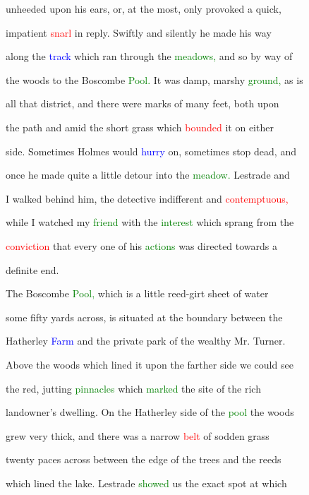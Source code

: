  unheeded upon his ears, or, at the most, only provoked a quick,

 \textcolor{BurntOrange}{impatient} \textcolor{red}{snarl} in reply. Swiftly and silently he made his way

 along the \textcolor{blue}{track} which ran through the \textcolor{green}{meadows,} and so by way of

 the woods to the Boscombe \textcolor{green}{Pool.} It was damp, marshy \textcolor{green}{ground,} as is

 all that district, and there were marks of many feet, both upon

 the path and amid the short grass which \textcolor{red}{bounded} it on either

 side. Sometimes Holmes would \textcolor{blue}{hurry} on, sometimes stop dead, and

 once he made quite a little detour into the \textcolor{green}{meadow.} Lestrade and

 I walked behind him, the detective indifferent and \textcolor{red}{contemptuous,}

 while I \textcolor{BurntOrange}{watched} my \textcolor{green}{friend} with the \textcolor{green}{interest} which sprang from the

 \textcolor{red}{conviction} that every one of his \textcolor{green}{actions} was directed towards a

 definite end.



 The Boscombe \textcolor{green}{Pool,} which is a little reed-girt sheet of water

 some fifty yards across, is situated at the boundary between the

 Hatherley \textcolor{blue}{Farm} and the private park of the wealthy Mr. Turner.

 Above the woods which lined it upon the farther side we could see

 the red, jutting \textcolor{green}{pinnacles} which \textcolor{green}{marked} the site of the rich

 landowner's dwelling. On the Hatherley side of the \textcolor{green}{pool} the woods

 \textcolor{BurntOrange}{grew} very thick, and there was a narrow \textcolor{red}{belt} of sodden grass

 twenty paces across between the edge of the \textcolor{BurntOrange}{trees} and the reeds

 which lined the lake. Lestrade \textcolor{green}{showed} us the exact spot at which


